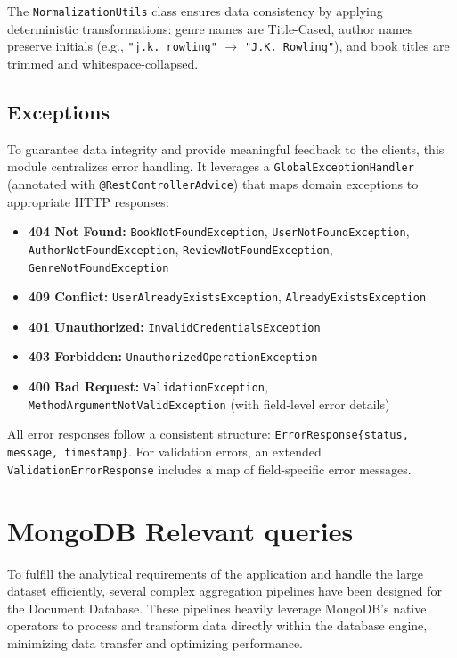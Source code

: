 The \texttt{NormalizationUtils} class ensures data consistency by applying deterministic transformations: genre names are Title-Cased, author names preserve initials (e.g., \texttt{"j.k. rowling"} $\rightarrow$ \texttt{"J.K. Rowling"}), and book titles are trimmed and whitespace-collapsed.

\subsection{Exceptions}
To guarantee data integrity and provide meaningful feedback to the clients, this module centralizes error handling. It leverages a \texttt{GlobalExceptionHandler} (annotated with \texttt{@RestControllerAdvice}) that maps domain exceptions to appropriate HTTP responses:

\begin{itemize}
    \item \textbf{404 Not Found:} \texttt{BookNotFoundException}, \texttt{UserNotFoundException}, \texttt{AuthorNotFoundException}, \texttt{ReviewNotFoundException}, \texttt{GenreNotFoundException}
    \item \textbf{409 Conflict:} \texttt{UserAlreadyExistsException}, \texttt{AlreadyExistsException}
    \item \textbf{401 Unauthorized:} \texttt{InvalidCredentialsException}
    \item \textbf{403 Forbidden:} \texttt{UnauthorizedOperationException}
    \item \textbf{400 Bad Request:} \texttt{ValidationException}, \texttt{MethodArgumentNotValidException} (with field-level error details)
\end{itemize}

All error responses follow a consistent structure: \texttt{ErrorResponse\{status, message, timestamp\}}. For validation errors, an extended \texttt{ValidationErrorResponse} includes a map of field-specific error messages.

\section{MongoDB Relevant queries}
To fulfill the analytical requirements of the application and handle the large dataset efficiently, several complex aggregation pipelines have been designed for the Document Database. These pipelines heavily leverage MongoDB's native operators to process and transform data directly within the database engine, minimizing data transfer and optimizing performance.

